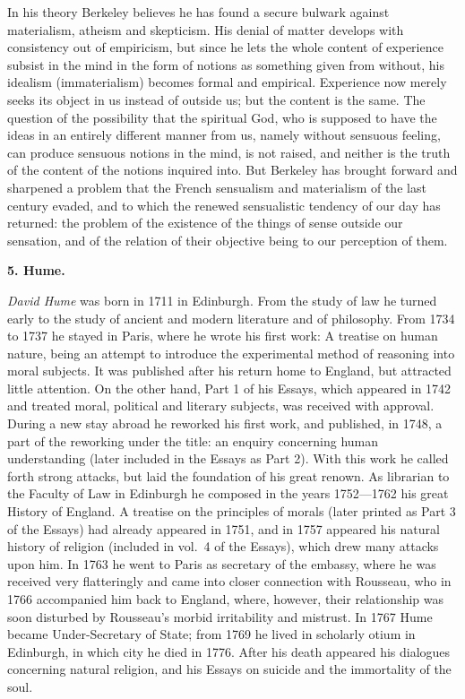 In his theory Berkeley believes he has found a secure bulwark against
materialism, atheism and skepticism. His denial of matter develops with
consistency out of empiricism, but since he lets the whole content of
experience subsist in the mind in the form of notions as something
given from without, his idealism (immaterialism) becomes formal and
empirical. Experience now merely seeks its object in us instead of
outside us; but the content is the same. The question of the
possibility that the spiritual God, who is supposed to have the ideas
in an entirely different manner from us, namely without sensuous
feeling, can produce sensuous notions in the mind, is not raised, and
neither is the truth of the content of the notions inquired into. But
Berkeley has brought forward and sharpened a problem that the French
sensualism and materialism of the last century evaded, and to which the
renewed sensualistic tendency of our day has returned: the problem of
the existence of the things of sense outside our sensation, and of the
relation of their objective being to our perception of them.

\divrule

\begin{center}
  \textbf{5. Hume.}
\end{center}

\emph{David Hume} was born in 1711 in Edinburgh. From the study of law
he turned early to the study of ancient and modern literature and of
philosophy. From 1734 to 1737 he stayed in Paris, where he wrote his
first work: A treatise on human nature, being an attempt to introduce
the experimental method of reasoning into moral subjects. It was
published after his return home to England, but attracted little
attention. On the other hand, Part 1 of his Essays, which appeared in
1742 and treated moral, political and literary subjects, was received
with approval. During a new stay abroad he reworked his first work, and
published, in 1748, a part of the reworking under the title: an enquiry
concerning human understanding (later included in the Essays as
Part 2). With this work he called forth strong attacks, but laid the
foundation of his great renown. As librarian to the Faculty of Law in
Edinburgh he composed in the years 1752---1762 his great History of
England. A treatise on the principles of morals (later printed as
Part 3 of the Essays) had already appeared in 1751, and in 1757 appeared
his natural history of religion (included in vol.~4 of the Essays),
which drew many attacks upon him. In 1763 he went to Paris as secretary
of the embassy, where he was received very flatteringly and came into
closer connection with Rousseau, who in 1766 accompanied him back to
England, where, however, their relationship was soon disturbed by
Rousseau's morbid irritability and mistrust. In 1767 Hume became
Under-Secretary of State; from 1769 he lived in scholarly otium in
Edinburgh, in which city he died in 1776. After his death appeared his
dialogues concerning natural religion, and his Essays on suicide and
the immortality of the soul.

